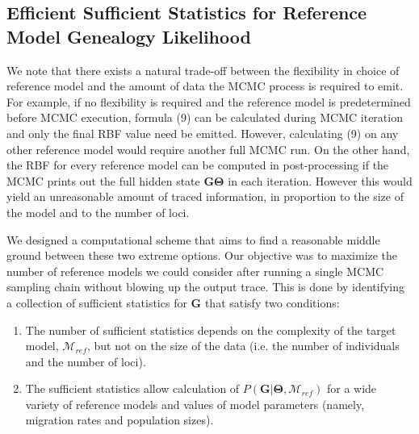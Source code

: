 \documentclass[11pt]{article}
\newcommand{\vect}[1]{\boldsymbol{\mathbf{#1}}}
\newcommand{\M}{\mathcal{M}}
\newcommand{\G}{\vect{G}}
\newcommand{\T}{\vect{\Theta}}
\newcommand{\GT}{\G\T}
\newcommand{\Mref}{\M_{ref}}
\newcommand{\1}{\mathbbm{1}}
\begin{document}
\subsection{Efficient Sufficient Statistics for Reference Model Genealogy Likelihood}


We note that there exists a natural trade-off between the flexibility in choice of reference model and the amount of data the MCMC process is required to emit. For example, if no flexibility is required and the reference model is predetermined before MCMC execution, formula (9) can be calculated during MCMC iteration and only the final RBF value need be emitted. However, calculating (9) on any other reference model would require another full MCMC run.
%
On the other hand, the RBF for every reference model can be computed in post-processing if the MCMC prints out the full hidden state $\GT$ in each iteration.
%
However this would yield an unreasonable amount of traced information, in proportion to the size of the model and to the number of loci.


We designed a computational scheme that aims to find a reasonable middle ground between these two extreme options.
Our objective was to maximize the number of reference models we could consider after running a single MCMC sampling chain without blowing up the output trace.
This is done by identifying a collection of sufficient statistics for $\G$ that satisfy two conditions:
%
%
\begin{enumerate}
 \item The number of sufficient statistics depends on the complexity of the target model, $\Mref$, but not on the size of the data (i.e. the number of individuals and the number of loci).
 \item The sufficient statistics allow calculation of $P(\G|\T,\Mref)$ for a wide variety of reference models and values of model parameters (namely, migration rates and population sizes).
\end{enumerate}
%
\end{document}
